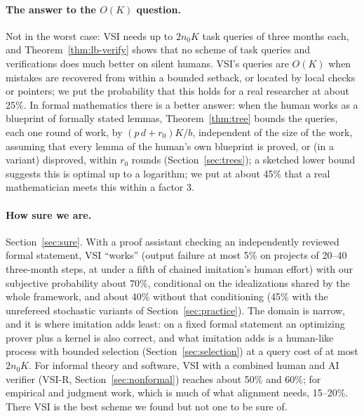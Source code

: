 \documentclass[11pt]{article}
\theoremstyle{definition}
\theoremstyle{remark}
\newcommand{\K}{K}
\begin{document}
\paragraph{The answer to the $O(\K)$ question.} Not in the worst case: VSI needs up to $2n_0\K$ task queries of three months each, and Theorem~\ref{thm:lb-verify} shows that no scheme of task queries and verifications does much better on silent humans. VSI's queries are $O(\K)$ when mistakes are recovered from within a bounded setback, or located by local checks or pointers; we put the probability that this holds for a real researcher at about 25\%. In formal mathematics there is a better answer: when the human works as a blueprint of formally stated lemmas, Theorem~\ref{thm:tree} bounds the queries, each one round of work, by $(p\,d+r_0)\K/b$, independent of the size of the work, assuming that every lemma of the human's own blueprint is proved, or (in a variant) disproved, within $r_0$ rounds (Section~\ref{sec:trees}); a sketched lower bound suggests this is optimal up to a logarithm; we put at about 45\% that a real mathematician meets this within a factor 3.

\paragraph{How sure we are.} Section~\ref{sec:sure}. With a proof assistant checking an independently reviewed formal statement, VSI ``works'' (output failure at most 5\% on projects of 20--40 three-month steps, at under a fifth of chained imitation's human effort) with our subjective probability about $70\%$, conditional on the idealizations shared by the whole framework, and about 40\% without that conditioning (45\% with the unrefereed stochastic variants of Section~\ref{sec:practice}). The domain is narrow, and it is where imitation adds least: on a fixed formal statement an optimizing prover plus a kernel is also correct, and what imitation adds is a human-like process with bounded selection (Section~\ref{sec:selection}) at a query cost of at most $2n_0\K$. For informal theory and software, VSI with a combined human and AI verifier (VSI-R, Section~\ref{sec:nonformal}) reaches about 50\% and 60\%; for empirical and judgment work, which is much of what alignment needs, 15--20\%. There VSI is the best scheme we found but not one to be sure of.
\end{document}
